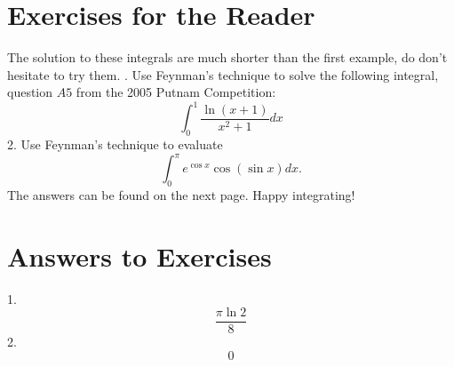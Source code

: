 \documentclass{article}
\begin{document}
\section*{Exercises for the Reader}
The solution to these integrals are much shorter than the first example, do don't hesitate to try them.
\newline {}. Use Feynman's technique to solve the following integral, question $A5$ from the 2005 Putnam Competition:
$$\int_{0}^{1}\frac{\ln(x+1)}{x^2+1}dx$$
2. Use Feynman's technique to evaluate
$$\int_{0}^{\pi}e^{\cos{x}}\cos{(\sin{x})}dx.$$
The answers can be found on the next page. Happy integrating!
\newpage
\section*{Answers to Exercises}
1. $$\frac{\pi\ln{2}}{8}$$
2. $$0$$
\end{document}
